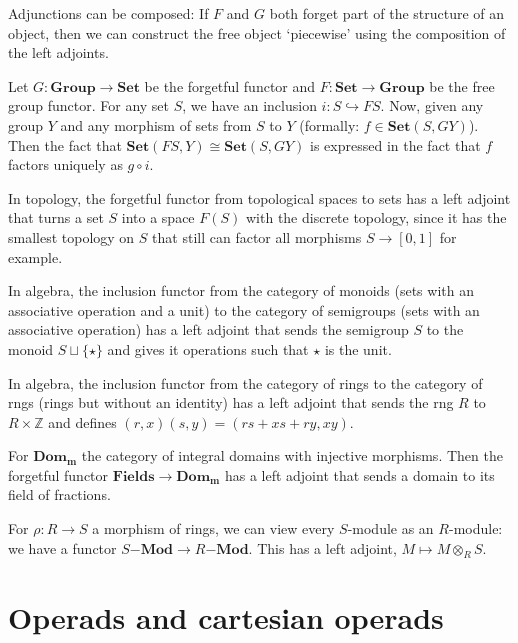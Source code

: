 \documentclass{amsbook}
\newcommand{\Catb}[1]{\mathbf{#1}}
\newcommand{\SET}{\Catb{Set}}
\newcommand{\Hom}[3]{{#1}(#2,#3)}
\begin{document}
  Adjunctions can be composed: If $ F $ and $ G $ both forget part of the structure of an object, then we can construct the free object `piecewise' using the composition of the left adjoints.

  Let $ G: \Catb{Group} \to \SET $ be the forgetful functor and $ F: \SET \to \Catb{Group} $ be the free group functor. For any set $ S $, we have an inclusion $ i: S \hookrightarrow F S $. Now, given any group $ Y $ and any morphism of sets from $ S $ to $ Y $ (formally: $ f \in \Hom \SET S {G Y} $). Then the fact that $ \Hom \SET {FS} Y \cong \Hom \SET S {G Y} $ is expressed in the fact that $ f $ factors uniquely as $ g \circ i $.
  \begin{center}
  \end{center}

  In topology, the forgetful functor from topological spaces to sets has a left adjoint that turns a set $ S $ into a space $ F(S) $ with the discrete topology, since it has the smallest topology on $ S $ that still can factor all morphisms $ S \to [0, 1] $ for example.

  In algebra, the inclusion functor from the category of monoids (sets with an associative operation and a unit) to the category of semigroups (sets with an associative operation) has a left adjoint that sends the semigroup $ S $ to the monoid $ S \sqcup \{ \star \} $ and gives it operations such that $ \star $ is the unit.

  In algebra, the inclusion functor from the category of rings to the category of rngs (rings but without an identity) has a left adjoint that sends the rng $ R $ to $ R \times \mathbb Z $ and defines $ (r, x) (s, y) = (rs + xs + ry, xy) $.

  For $ \Catb{Dom_m} $ the category of integral domains with injective morphisms. Then the forgetful functor $ \Catb{Fields} \to \Catb{Dom_m} $ has a left adjoint that sends a domain to its field of fractions.

  For $ \rho: R \to S $ a morphism of rings, we can view every $ S $-module as an $ R $-module: we have a functor $ S\Catb{-Mod} \to R\Catb{-Mod} $. This has a left adjoint, $ M \mapsto M \otimes_R S $.

  \section{Operads and cartesian operads}
\end{document}
